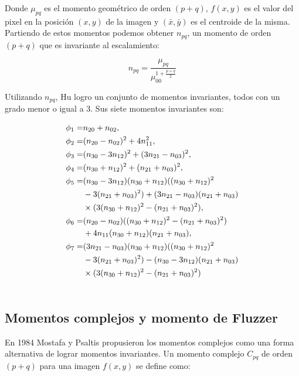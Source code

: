 \documentclass[a4paper, 11pt, oneside]{report}
\begin{document}
Donde $\mu_{pq}$ es el momento geométrico de orden $(p+q)$, $f(x,y)$ es el valor del pixel en la posición $(x,y)$ de la imagen y $(\bar{x},\bar{y})$ es el centroide de la misma. Partiendo de estos momentos podemos obtener $n_{pq}$, un momento de orden $(p+q)$ que es invariante al escalamiento:

	\begin{equation}\label{eq2}
		n_{pq} = \frac{\mu_{pq}}{ \mu_{00}^{1+\frac{p+q}{2}} }
	\end{equation}

Utilizando $n_{pq}$, Hu logro un conjunto de momentos invariantes, todos con un grado menor o igual a 3. Sus siete momentos invariantes son:

	\begin{align}
		\phi_1 =& n_{20} + n_{02}, \notag\\ 
		\phi_2 =& (n_{20} - n_{02})^{2} + 4n_{11}^{2}, \notag \\ 
		\phi_3 =& (n_{30} - 3n_{12})^{2} + (3n_{21} - n_{03})^{2}, \notag \\ 
		\phi_4 =& (n_{30} + n_{12})^{2} + (n_{21} + n_{03})^{2},\notag \\ 
		\phi_5 =& (n_{30} - 3n_{12})(n_{30} + n_{12})((n_{30} + n_{12})^{2} \notag \\
				& - 3(n_{21} + n_{03})^{2}) + (3n_{21} - n_{03})(n_{21} + n_{03})\notag\\ 
				& \times (3(n_{30} + n_{12})^{2} - (n_{21} + n_{03})^{2}),\notag\\ 
		\phi_6 =& (n_{20} - n_{02})((n_{30} + n_{12})^{2} - (n_{21} + n_{03})^{2})\notag\\
				& + 4n_{11}(n_{30} + n_{12})(n_{21} + n_{03}),\notag\\
		\phi_7 =& (3n_{21} - n_{03})(n_{30} + n_{12})((n_{30} + n_{12})^{2}\notag\\
				& - 3(n_{21} + n_{03})^{2}) - (n_{30} - 3n_{12})(n_{21} + n_{03}) \notag\\
				& \times (3(n_{30} + n_{12})^{2} - (n_{21} + n_{03})^{2}) \label{eq:huMom} \\ \notag
	\end{align}

\subsection{Momentos complejos y momento de Fluzzer}

En 1984 Mostafa y Psaltis \cite{mostaf84} propusieron los momentos complejos como una forma alternativa de lograr momentos invariantes. Un momento complejo $C_{pq}$ de orden $(p+q)$ para una imagen $f(x,y)$ se define como:
\end{document}

